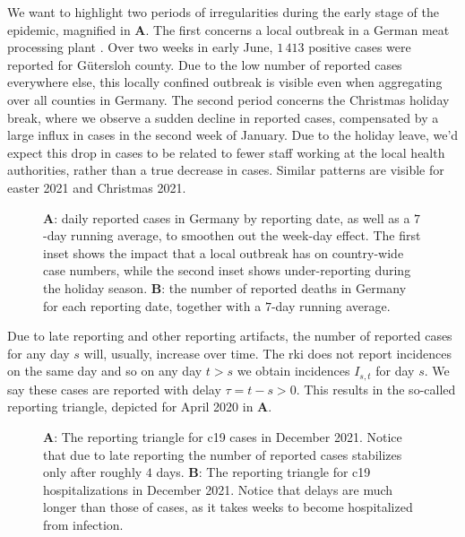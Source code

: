 We want to highlight two periods of irregularities during the early stage of the epidemic, magnified in  \textbf{A}. The first concerns a local outbreak in a German meat processing plant \citep{Gunther2020SARSCoV2}. Over two weeks in early June, $1\,413$ positive cases were reported for Gütersloh county. Due to the low number of reported cases everywhere else, this locally confined outbreak is visible even when aggregating over all counties in Germany. 
The second period concerns the Christmas holiday break, where we observe a sudden decline in reported cases, compensated by a large influx in cases in the second week of January. Due to the holiday leave, we'd expect this drop in cases to be related to fewer staff working at the local health authorities, rather than a true decrease in cases. Similar patterns are visible for easter 2021 and Christmas 2021. 

\begin{figure}
    \resizebox{\textwidth}{!}{%
    }
    \caption{\textbf{A}: daily reported cases in Germany by reporting date, as well as a $7$-day running average, to smoothen out the week-day effect. The first inset shows the impact that a local outbreak \citep{Gunther2020SARSCoV2} has on country-wide case numbers, while the second inset shows under-reporting during the holiday season.  \textbf{B}: the number of reported deaths in Germany for each reporting date, together with a $7$-day running average.}
    \label{fig:cases_germany}
\end{figure}



Due to late reporting and other reporting artifacts, the number of reported cases for any day $s$ will, usually, increase over time. The \acrshort{rki} does not report incidences on the same day and so on any day $t > s$ we obtain incidences $I_{s,t}$ for day $s$. We say these cases are reported with delay $\tau = t -s > 0$. This results in the so-called reporting triangle, depicted for April 2020 in  \textbf{A}. 

\begin{figure}
    \resizebox{\textwidth}{!}{%
    }
    \caption{\textbf{A}: The reporting triangle for \acrshort{c19} cases in December 2021. Notice that due to late reporting the number of reported cases stabilizes only after roughly $4$ days. \textbf{B}: The reporting triangle for \acrshort{c19} hospitalizations in December 2021. Notice that delays are much longer than those of cases, as it takes weeks to become hospitalized from infection.}
    \label{fig:reporting_delays_cases}
\end{figure}

